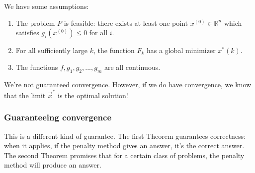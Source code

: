 \documentclass[11pt,a4paper]{article}
\newtheorem{theorem}{Theorem}
\begin{document}
We have some assumptions:
\begin{enumerate}[$(1)$]
    \item The problem $P$ is feasible: there exists at least one point $x^{(0)} \in \mathbb{R}^n$ which satisfies $g_i(x^{(0)}) \leq 0$ for all $i$.
    \item For all sufficiently large $k$, the function $F_k$ has a global minimizer $x^*(k)$.
    \item The functions $f,g_1,g_2,...,g_m$ are all continuous.
\end{enumerate}
We're not guaranteed convergence. However, if we do have convergence, we know that the limit $\vec{x}^*$ is the optimal solution!
\begin{center}
\end{center}


\subsubsection{Guaranteeing convergence}
\begin{center}
\end{center}

This is a different kind of guarantee. The first Theorem guarantees correctness: when it applies, if the penalty method gives an answer, it's the correct answer. The second Theorem promises that for a certain class of problems, the penalty method will produce an answer.
\end{document}
